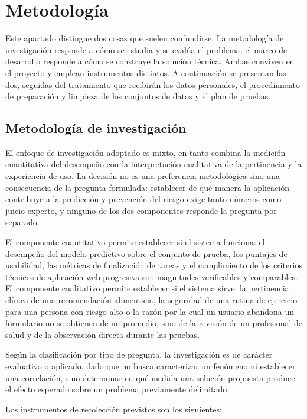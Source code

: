 \documentclass[conference]{IEEEtran}
\begin{document}
\section{Metodología}
Este apartado distingue dos cosas que suelen confundirse. La metodología de investigación responde a cómo se estudia y se evalúa el problema; el marco de desarrollo responde a cómo se construye la solución técnica. Ambas conviven en el proyecto y emplean instrumentos distintos. A continuación se presentan las dos, seguidas del tratamiento que recibirán los datos personales, el procedimiento de preparación y limpieza de los conjuntos de datos y el plan de pruebas.

\subsection{Metodología de investigación}
El enfoque de investigación adoptado es mixto, en tanto combina la medición cuantitativa del desempeño con la interpretación cualitativa de la pertinencia y la experiencia de uso. La decisión no es una preferencia metodológica sino una consecuencia de la pregunta formulada: establecer de qué manera la aplicación contribuye a la predicción y prevención del riesgo exige tanto números como juicio experto, y ninguno de los dos componentes responde la pregunta por separado.

El componente cuantitativo permite establecer si el sistema funciona: el desempeño del modelo predictivo sobre el conjunto de prueba, los puntajes de usabilidad, las métricas de finalización de tareas y el cumplimiento de los criterios técnicos de aplicación web progresiva son magnitudes verificables y comparables. El componente cualitativo permite establecer si el sistema sirve: la pertinencia clínica de una recomendación alimenticia, la seguridad de una rutina de ejercicio para una persona con riesgo alto o la razón por la cual un usuario abandona un formulario no se obtienen de un promedio, sino de la revisión de un profesional de salud y de la observación directa durante las pruebas.

Según la clasificación por tipo de pregunta, la investigación es de carácter evaluativo o aplicado, dado que no busca caracterizar un fenómeno ni establecer una correlación, sino determinar en qué medida una solución propuesta produce el efecto esperado sobre un problema previamente delimitado.

Los instrumentos de recolección previstos son los siguientes:
\end{document}
